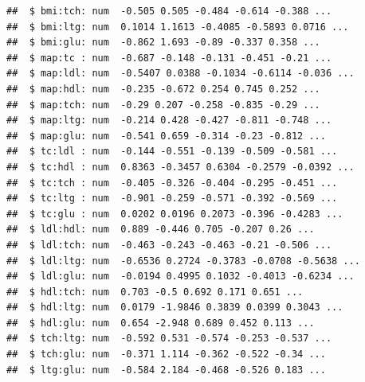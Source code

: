 \documentclass[]{beamer}\usepackage[]{graphicx}\usepackage[]{color}
\makeatletter
\newenvironment{kframe}{%
 \def\at@end@of@kframe{}%
 \ifinner\ifhmode%
  \def\at@end@of@kframe{\end{minipage}}%
  \begin{minipage}{\columnwidth}%
 \fi\fi%
 \def\FrameCommand##1{\hskip\@totalleftmargin \hskip-\fboxsep
 \colorbox{shadecolor}{##1}\hskip-\fboxsep
     \hskip-\linewidth \hskip-\@totalleftmargin \hskip\columnwidth}%
 \MakeFramed {\advance\hsize-\width
   \@totalleftmargin\z@ \linewidth\hsize
   \@setminipage}}%
 {\par\unskip\endMakeFramed%
 \at@end@of@kframe}
\newenvironment{knitrout}{}{} %
\makeatother
\begin{document}
\begin{frame}[fragile]
\begin{knitrout}
\begin{kframe}
\begin{verbatim}
##  $ bmi:tch: num  -0.505 0.505 -0.484 -0.614 -0.388 ...
##  $ bmi:ltg: num  0.1014 1.1613 -0.4085 -0.5893 0.0716 ...
##  $ bmi:glu: num  -0.862 1.693 -0.89 -0.337 0.358 ...
##  $ map:tc : num  -0.687 -0.148 -0.131 -0.451 -0.21 ...
##  $ map:ldl: num  -0.5407 0.0388 -0.1034 -0.6114 -0.036 ...
##  $ map:hdl: num  -0.235 -0.672 0.254 0.745 0.252 ...
##  $ map:tch: num  -0.29 0.207 -0.258 -0.835 -0.29 ...
##  $ map:ltg: num  -0.214 0.428 -0.427 -0.811 -0.748 ...
##  $ map:glu: num  -0.541 0.659 -0.314 -0.23 -0.812 ...
##  $ tc:ldl : num  -0.144 -0.551 -0.139 -0.509 -0.581 ...
##  $ tc:hdl : num  0.8363 -0.3457 0.6304 -0.2579 -0.0392 ...
##  $ tc:tch : num  -0.405 -0.326 -0.404 -0.295 -0.451 ...
##  $ tc:ltg : num  -0.901 -0.259 -0.571 -0.392 -0.569 ...
##  $ tc:glu : num  0.0202 0.0196 0.2073 -0.396 -0.4283 ...
##  $ ldl:hdl: num  0.889 -0.446 0.705 -0.207 0.26 ...
##  $ ldl:tch: num  -0.463 -0.243 -0.463 -0.21 -0.506 ...
##  $ ldl:ltg: num  -0.6536 0.2724 -0.3783 -0.0708 -0.5638 ...
##  $ ldl:glu: num  -0.0194 0.4995 0.1032 -0.4013 -0.6234 ...
##  $ hdl:tch: num  0.703 -0.5 0.692 0.171 0.651 ...
##  $ hdl:ltg: num  0.0179 -1.9846 0.3839 0.0399 0.3043 ...
##  $ hdl:glu: num  0.654 -2.948 0.689 0.452 0.113 ...
##  $ tch:ltg: num  -0.592 0.531 -0.574 -0.253 -0.537 ...
##  $ tch:glu: num  -0.371 1.114 -0.362 -0.522 -0.34 ...
##  $ ltg:glu: num  -0.584 2.184 -0.468 -0.526 0.183 ...
\end{verbatim}
\end{kframe}
\end{knitrout}


\end{frame}
\end{document}
